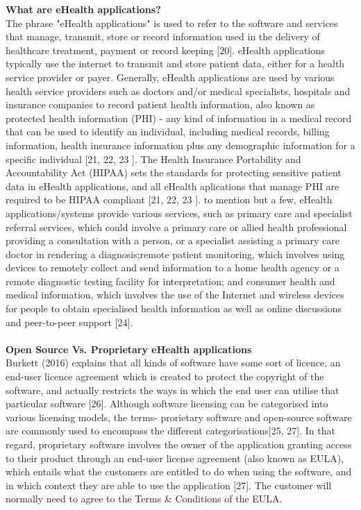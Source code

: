 \documentclass[a4paper]{article}
\begin{document}
{\bf What are eHealth applications?} \\
The phrase "eHealth applications" is used to refer to the software and services that manage, transmit, store or record information used in the delivery of healthcare treatment, payment or record keeping [20]. eHealth applications typically use the internet to transmit and store patient data, either for a health service provider or payer. Generally, eHealth applications are used by various health service providers such as doctors and/or medical specialists, hospitals and insurance companies to record patient health information, also known as protected health information (PHI) - any kind of information in a medical record that can be used to identify an individual, including medical records, billing information, health insurance information plus any demographic information for a specific individual [21, 22, 23 ]. The Health Insurance Portability and Accountability Act (HIPAA) sets the standards for protecting sensitive patient data in eHealth applications, and all eHealth aplications that manage PHI are required to be HIPAA compliant [21, 22, 23 ]. to mention but a few, eHealth applications/systems provide various services, such as primary care and specialist referral services, which could involve a primary care or allied health professional providing a consultation with a person, or a specialist assisting a primary care doctor in rendering a diagnosis;remote patient monitoring, which involves using devices to remotely collect and send information to a home health agency or a remote diagnostic testing facility for interpretation; and consumer health and medical information, which involves the use of the Internet and wireless devices for people to obtain specialised health information as well as online discussions and peer-to-peer support [24].\\ \\
{\bf Open Source Vs. Proprietary eHealth applications}\\
Burkett (2016) explains that all kinds of software have some sort of licence, an end-user licence agreement which is created to protect the copyright of the software, and actually restricts the ways in which the end user can utilise that particular software [26]. Although software licensing can be categorised into various licensing models, the terms- prorietary software and open-source software are commonly used to encompass the different categorisations[25, 27]. In that regard, proprietary software involves the owner of the application granting access to their product through an end-user license agreement (also known as EULA), which entails what the customers are entitled to do when using the software, and in which context they are able to use the application [27]. The customer will normally need to agree to the Terms & Conditions of the EULA.\\
\end{document}
